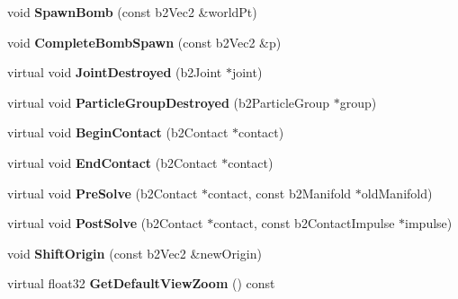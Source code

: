 \begin{DoxyCompactItemize}
\item 
\hypertarget{classTest_a3c7ac01710bbc0371aa0513b970cb4a4}{void {\bfseries Spawn\-Bomb} (const b2\-Vec2 \&world\-Pt)}\label{classTest_a3c7ac01710bbc0371aa0513b970cb4a4}

\item 
\hypertarget{classTest_a5f79351b4f312e7ecbdbfd92e76fc806}{void {\bfseries Complete\-Bomb\-Spawn} (const b2\-Vec2 \&p)}\label{classTest_a5f79351b4f312e7ecbdbfd92e76fc806}

\item 
\hypertarget{classTest_a27badb0e44400afbbbb101e58ac7bf4f}{virtual void {\bfseries Joint\-Destroyed} (b2\-Joint $\ast$joint)}\label{classTest_a27badb0e44400afbbbb101e58ac7bf4f}

\item 
\hypertarget{classTest_a6ba300758e0ee4307159d689d91d38ac}{virtual void {\bfseries Particle\-Group\-Destroyed} (b2\-Particle\-Group $\ast$group)}\label{classTest_a6ba300758e0ee4307159d689d91d38ac}

\item 
\hypertarget{classTest_ade381c3186c925cdf5dc30b0153411ba}{virtual void {\bfseries Begin\-Contact} (b2\-Contact $\ast$contact)}\label{classTest_ade381c3186c925cdf5dc30b0153411ba}

\item 
\hypertarget{classTest_a07844a975adb8d27f9523db4addd9813}{virtual void {\bfseries End\-Contact} (b2\-Contact $\ast$contact)}\label{classTest_a07844a975adb8d27f9523db4addd9813}

\item 
\hypertarget{classTest_ab815ed5d709ccbcbe567838e01fe30c4}{virtual void {\bfseries Pre\-Solve} (b2\-Contact $\ast$contact, const b2\-Manifold $\ast$old\-Manifold)}\label{classTest_ab815ed5d709ccbcbe567838e01fe30c4}

\item 
\hypertarget{classTest_a7e4aa8d83b8aa30bcd40cf9b1fde2193}{virtual void {\bfseries Post\-Solve} (b2\-Contact $\ast$contact, const b2\-Contact\-Impulse $\ast$impulse)}\label{classTest_a7e4aa8d83b8aa30bcd40cf9b1fde2193}

\item 
\hypertarget{classTest_a447e17296ea650120b44ec31f71bb12f}{void {\bfseries Shift\-Origin} (const b2\-Vec2 \&new\-Origin)}\label{classTest_a447e17296ea650120b44ec31f71bb12f}

\item 
\hypertarget{classTest_a19ff7392fd33f09ea12187c660ed329b}{virtual float32 {\bfseries Get\-Default\-View\-Zoom} () const }\label{classTest_a19ff7392fd33f09ea12187c660ed329b}


\end{DoxyCompactItemize}
